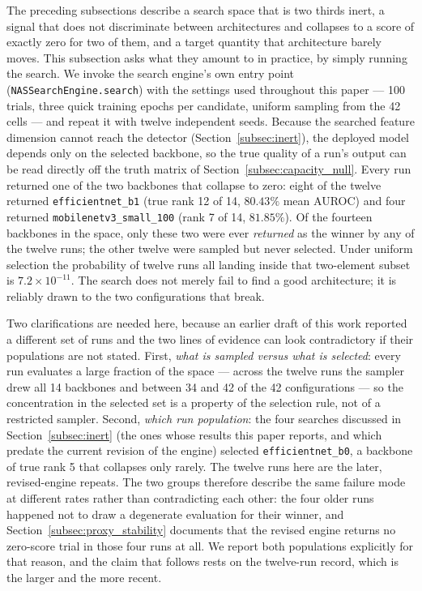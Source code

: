 The preceding subsections describe a search space that is two thirds inert, a
signal that does not discriminate between architectures and collapses to a score
of exactly zero for two of them, and a target quantity that architecture barely
moves. This subsection asks what they amount to in practice, by simply running the
search. We invoke the search engine's own entry point
(\texttt{NASSearchEngine.search}) with the settings used throughout this paper --- 100 trials,
three quick training epochs per candidate, uniform sampling from the 42 cells ---
and repeat it with twelve independent seeds. Because the searched feature
dimension cannot reach the detector (Section~\ref{subsec:inert}), the deployed
model depends only on the selected backbone, so the true quality of a run's output
can be read directly off the truth matrix of
Section~\ref{subsec:capacity_null}. Every run returned one of the two backbones
that collapse to zero: eight of the twelve returned \texttt{efficientnet\_b1}
(true rank 12 of 14, $80.43\%$ mean AUROC) and four returned
\texttt{mobilenetv3\_small\_100} (rank 7 of 14, $81.85\%$). Of the fourteen
backbones in the space, only these two were ever \emph{returned} as the winner by
any of the twelve runs; the other twelve were sampled but never selected. Under
uniform selection the probability of twelve
runs all landing inside that two-element subset is $7.2\times10^{-11}$. The search
does not merely fail to find a good architecture; it is reliably drawn to the two
configurations that break.

Two clarifications are needed here, because an earlier draft of this work reported
a different set of runs and the two lines of evidence can look contradictory if
their populations are not stated. First, \emph{what is sampled versus what is
selected}: every run evaluates a large fraction of the space --- across the twelve
runs the sampler drew all 14 backbones and between 34 and 42 of the 42
configurations --- so the concentration in the selected set is a property of the
selection rule, not of a restricted sampler. Second, \emph{which run population}:
the four searches discussed in Section~\ref{subsec:inert} (the ones whose results
this paper reports, and which predate the current revision of the engine)
selected \texttt{efficientnet\_b0}, a backbone of true rank 5 that collapses only
rarely. The twelve runs here are the later, revised-engine repeats. The two groups
therefore describe the same failure mode at different rates rather than
contradicting each other: the four older runs happened not to draw a degenerate
evaluation for their winner, and Section~\ref{subsec:proxy_stability} documents
that the revised engine returns no zero-score trial in those four runs at all. We
report both populations explicitly for that reason, and the claim that follows
rests on the twelve-run record, which is the larger and the more recent.

